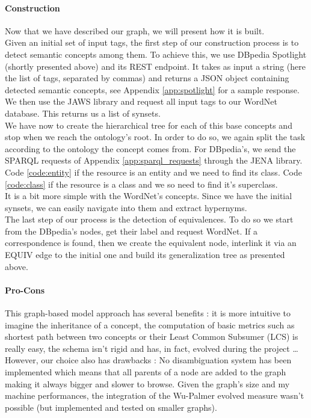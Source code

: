 \paragraph{Construction} %
\label{par:construction}
Now that we have described our graph, we will present how it is built.\\
Given an initial set of input tags, the first step of our construction process is to detect semantic concepts among them. To achieve this, we use DBpedia Spotlight (shortly presented above) and its REST endpoint. It takes as input a string (here the list of tags, separated by commas) and returns a JSON object containing detected semantic concepts, see Appendix \ref{app:spotlight} for a sample response. We then use the JAWS library and request all input tags to our WordNet database. This returns us a list of synsets.\\
We have now to create the hierarchical tree for each of this base concepts and stop when we reach the ontology's root. In order to do so, we again split the task according to the ontology the concept comes from. For DBpedia's, we send the SPARQL requests of Appendix \ref{app:sparql_requests} through the JENA library. Code \ref{code:entity} if the resource is an entity and we need to find its class. Code \ref{code:class} if the resource is a class and we so need to find it's superclass.\\
It is a bit more simple with the WordNet's concepts. Since we have the initial synsets, we can easily navigate into them and extract hypernyms.\\
The last step of our process is the detection of equivalences. To do so we start from the DBpedia's nodes, get their label and request WordNet. If a correspondence is found, then we create the equivalent node, interlink it via an EQUIV edge to the initial one and build its generalization tree as presented above.
\paragraph{Pro-Cons} %
\label{par:pro_cons}
This graph-based model approach has several benefits : it is more intuitive to imagine the inheritance of a concept, the computation of basic metrics such as shortest path between two concepts or their Least Common Subsumer (LCS) is really easy, the schema isn't rigid and has, in fact, evolved during the project \dots\\
However, our choice also has drawbacks : No disambiguation system has been implemented which means that all parents of a node are added to the graph making it always bigger and slower to browse. Given the graph's size and my machine performances, the integration of the Wu-Palmer evolved measure wasn't possible (but implemented and tested on smaller graphs).


